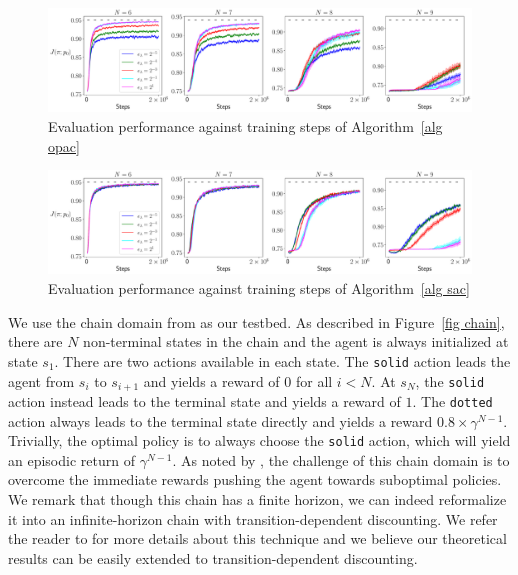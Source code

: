 \documentclass[twoside,11pt]{article}
\numberwithin{assucounter}{section}
\begin{document}
\begin{figure}[t]
  \centering
  \includegraphics[width=\textwidth]{img/sac_False.pdf}
  \caption{\label{fig opac} Evaluation performance against training steps of Algorithm~\ref{alg opac}}
\end{figure}
\begin{figure}[t]
  \centering
  \includegraphics[width=\textwidth]{img/sac_True.pdf}
  \caption{\label{fig sac} Evaluation performance against training steps of Algorithm~\ref{alg sac}}
\end{figure}
We use the chain domain from \citet{laroche2021dr} as our testbed.
As described in Figure~\ref{fig chain},
there are $N$ non-terminal states in the chain and the agent is always initialized at state $s_1$.
There are two actions available in each state.
The \texttt{solid} action leads the agent from $s_i$ to $s_{i+1}$ and yields a reward of $0$ for all $i < N$.
At $s_N$,
the \texttt{solid} action instead leads to the terminal state and yields a reward of $1$.
The \texttt{dotted} action always leads to the terminal state directly and yields a reward $0.8 \times \gamma^{N-1}$.
Trivially,
the optimal policy is to always choose the \texttt{solid} action,
which will yield an episodic return of $\gamma^{N-1}$.
As noted by \citet{laroche2021dr},
the challenge of this chain domain is to overcome the immediate rewards pushing the agent towards suboptimal policies.
We remark that though this chain has a finite horizon,
we can indeed reformalize it into an infinite-horizon chain with transition-dependent discounting.
We refer the reader to \citet{white2017unifying} for more details about this technique and we believe our theoretical results can be easily extended to transition-dependent discounting.
\end{document}
